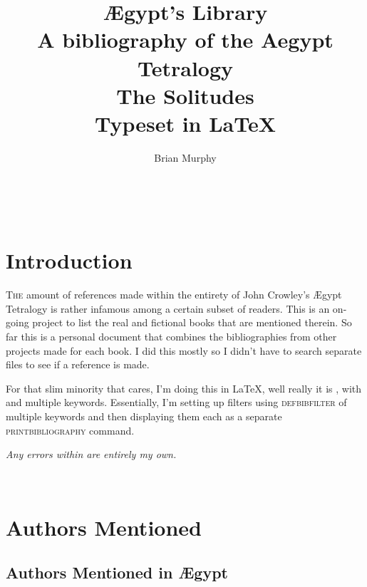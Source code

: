 \documentclass[10pt,makeidx]{extreport}
\author{Brian Murphy}
\title{
 {\Huge Ægypt's Library} \\
 {\footnotesize A bibliography of the Aegypt Tetralogy \\
 \bigskip
 {\Large The Solitudes} \\
 \bigskip
 Typeset in \LaTeX{} \\
 }
}
\date{\begin{small}\today{}\end{small}}
\newcommand\fleuron{\begin{turn}{45}\Large \ding{166}\end{turn}}
\newcommand\doublefleuron{%
	\reflectbox{\fleuron}\AC\staveXLIX\reflectbox{\AC}\fleuron}
\newcommand\fleuronbar{%
	{\huge\LinearACCCXIII}\xrfill[1.3ex]{1pt}\doublefleuron\xrfill[1.3ex]{1pt}\reflectbox{\huge\LinearACCCXIII}}
\newcommand\blankpage{%
    \null
    \thispagestyle{empty}%
    \addtocounter{page}{-1}%
    \newpage%
    \pagestyle{fancy}}
\newcommand\nbvspace[1][3]{\vspace*{\stretch{#1}}}
\begin{document}
%



\setcounter{tocdepth}{2}
\tableofcontents

\begin{center}
\vfill
\shadowoffset{1pt}
\shadowtext{%
{\color{Mahogany}\fontsize{50}{54}\Saturn}}\\
\nbvspace[1]
\end{center}

\pagestyle{fancy}

\pagestyle{fancy}
\chapter{Introduction}
\lettrine[lines=4,findent=3pt]{T}{he} amount of references made within the entirety of John Crowley's Ægypt Tetralogy is rather infamous among a certain subset of readers. This is an on-going project to list the real and fictional books that are mentioned therein. So far this is a personal document that combines the bibliographies from other projects made for each book. I did this mostly so I didn't have to search separate files to see if a reference is made. 

For that slim minority that cares, I'm doing this in \LaTeX{}, well really it is , with  and multiple keywords. Essentially, I'm setting up filters using \textsc{defbibfilter} of multiple keywords and then displaying them each as a separate \textsc{printbibliography} command.

\vspace*{1cm}

\begin{center}
	\textit{Any errors within are entirely my own.}
\end{center}

\begin{center}
\vfill
\shadowoffset{1pt}
\shadowtext{%
{\color{Mahogany}\fontsize{60}{64}\Mercury}}\\
\nbvspace[1]
\end{center}

\chapter{Authors Mentioned}
\section{Authors Mentioned in Ægypt}
\end{document}
